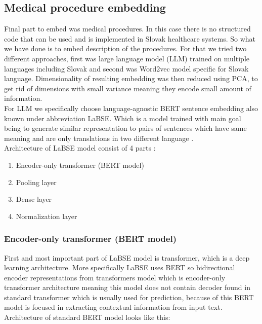 \subsection{Medical procedure embedding}
\label{procedureEmb}

Final part to embed was medical procedures. In this case there is no structured code that can be used and is implemented in Slovak healthcare systems. So what we have done is to embed description of the procedures. For that we tried two different approaches, first was large language model (LLM) trained on multiple languages including Slovak and second was Word2vec model specific for Slovak language. Dimensionality of resulting embedding was then reduced using PCA, to get rid of dimensions with small variance meaning they encode small amount of information. 
\\

For LLM we specifically choose language-agnostic BERT sentence embedding also known under abbreviation LaBSE. Which is a model trained with main goal being to generate similar representation to pairs of sentences which have same meaning and are only translations in two different language \cite{labse_kaggle}. 
\\

Architecture of LaBSE model consist of 4 parts \cite{labse_hug}:

\begin{enumerate}
	\item Encoder-only transformer (BERT model)
	\item Pooling layer
	\item Dense layer
	\item Normalization layer
\end{enumerate}

\subsubsection{Encoder-only transformer (BERT model)}
\label{emb:trans}

First and most important part of LaBSE model is transformer, which is a deep learning architecture. More specifically LaBSE uses BERT so bidirectional encoder representations from transformers model which is encoder-only transformer architecture meaning this model does not contain decoder found in standard transformer which is usually used for prediction, because of this BERT model is focused in extracting contextual information from input text. Architecture of standard BERT model looks like this: 
\\

